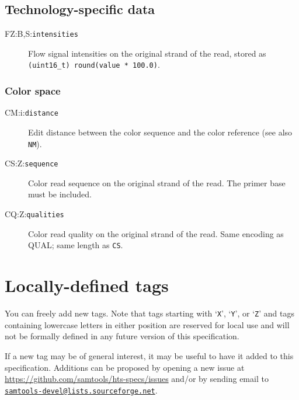 \documentclass[10pt]{article}
\newcommand{\mailtourl}[1]{\href{mailto:#1}{\tt #1}}
\newcommand{\tagvalue}[1]{\tt #1}
\begin{document}
\subsection{Technology-specific data}

\begin{description}
\item[FZ:B,S:\tagvalue{intensities}]
Flow signal intensities on the original strand of the read, stored as {\tt (uint16\_t) round(value * 100.0)}.
\end{description}

\subsubsection{Color space}


\begin{description}
\item[CM:i:\tagvalue{distance}]
Edit distance between the color sequence and the color reference (see also {\tt NM}).

\item[CS:Z:\tagvalue{sequence}]
Color read sequence on the original strand of the read. The primer base must be included.

\item[CQ:Z:\tagvalue{qualities}]
Color read quality on the original strand of the read. Same encoding as {\sf QUAL}; same length as {\tt CS}.
\end{description}

\section{Locally-defined tags}

You can freely add new tags.
Note that tags starting with `{\tt X}', `{\tt Y}', or `{\tt Z}' and tags
containing lowercase letters in either position are reserved for local use
and will not be formally defined in any future version of this specification.

If a new tag may be of general interest, it may be useful to have it added
to this specification.  Additions can be proposed by opening a new issue at
\url{https://github.com/samtools/hts-specs/issues} and/or by sending email
to \mailtourl{samtools-devel@lists.sourceforge.net}.
\end{document}

